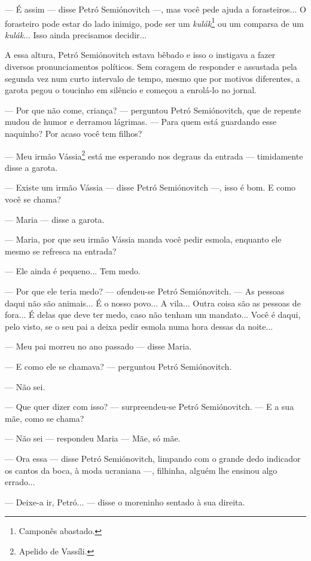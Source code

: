 --- É assim --- disse Petró Semiónovitch ---, mas você pede ajuda a
forasteiros... O forasteiro pode estar do lado inimigo, pode ser um
\emph{kulák}\footnote{Camponês abastado.} ou um comparsa de um
\emph{kulák}... Isso ainda precisamos decidir...

A essa altura, Petró Semiónovitch estava bêbado e isso o instigava a
fazer diversos pronunciamentos políticos. Sem coragem de responder e
assustada pela segunda vez num curto intervalo de tempo, mesmo que por
motivos diferentes, a garota pegou o toucinho em silêncio e começou a
enrolá-lo no jornal.

--- Por que não come, criança? --- perguntou Petró Semiónovitch, que de
repente mudou de humor e derramou lágrimas. --- Para quem está guardando
esse naquinho? Por acaso você tem filhos?

--- Meu irmão Vássia\footnote{Apelido de Vassíli.} está me esperando nos
degraus da entrada --- timidamente disse a garota.

--- Existe um irmão Vássia --- disse Petró Semiónovitch ---, isso é bom.
E como você se chama?

--- Maria --- disse a garota.

--- Maria, por que seu irmão Vássia manda você pedir esmola, enquanto
ele mesmo se refresca na entrada?

--- Ele ainda é pequeno... Tem medo.

--- Por que ele teria medo? --- ofendeu-se Petró Semiónovitch. --- As
pessoas daqui não são animais... É o nosso povo... A vila... Outra coisa
são as pessoas de fora... É delas que deve ter medo, caso não tenham um
mandato... Você é daqui, pelo visto, se o seu pai a deixa pedir esmola
numa hora dessas da noite...

--- Meu pai morreu no ano passado --- disse Maria.

--- E como ele se chamava? --- perguntou Petró Semiónovitch.

--- Não sei.

--- Que quer dizer com isso? --- surpreendeu-se Petró Semiónovitch. ---
E a sua mãe, como se chama?

--- Não sei --- respondeu Maria --- Mãe, só mãe.

--- Ora essa --- disse Petró Semiónovitch, limpando com o grande dedo
indicador os cantos da boca, à moda ucraniana ---, filhinha, alguém lhe
ensinou algo errado...

--- Deixe-a ir, Petró... --- disse o moreninho sentado à sua direita.

